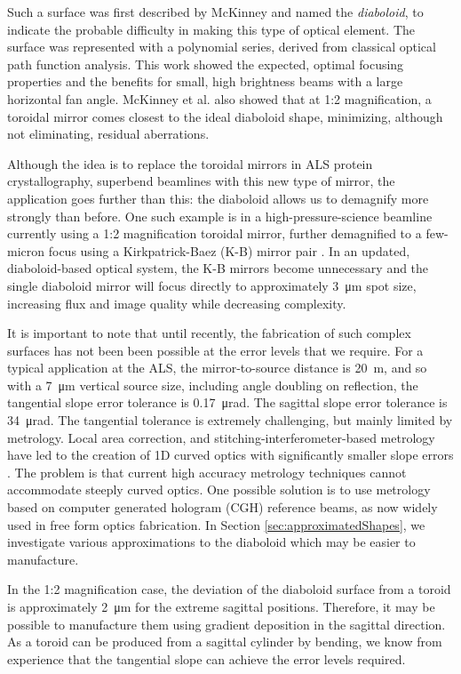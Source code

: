 \documentclass{iucr}       %
\begin{document}
Such a surface was first described by McKinney \cite{McKinneySPIE2009} and named the \emph{diaboloid}, to indicate the probable difficulty in making this type of optical element. The surface was represented with a polynomial series, derived from classical optical path function analysis. This work showed the expected, optimal focusing properties and the benefits for small, high brightness beams with a large horizontal fan angle. McKinney et al. also showed that at 1:2 magnification, a toroidal mirror comes closest to the ideal diaboloid shape, minimizing, although not eliminating, residual aberrations.

Although the idea is to replace the toroidal mirrors in ALS protein crystallography, superbend beamlines with this new type of mirror, the application goes further than this: the diaboloid allows us to demagnify more strongly than before. One such example is in a high-pressure-science beamline currently using a 1:2 magnification toroidal mirror, further demagnified to a few-micron focus using a Kirkpatrick-Baez (K-B) mirror pair \cite{Kirkpatrick1946}. In an updated, diaboloid-based optical system, the K-B mirrors become unnecessary and the single diaboloid mirror will focus directly to approximately \SI{3}{\micro\meter} spot size, increasing flux and image quality while decreasing complexity.

It is important to note that until recently, the fabrication of such complex surfaces has not been been possible at the error levels that we require. For a typical application at the ALS, the mirror-to-source distance is \SI{20}{\meter}, and so with a \SI{7}{\micro\meter} vertical source size, including angle doubling on reflection, the tangential slope error tolerance is \SI{0.17}{\micro\radian}. The sagittal slope error tolerance is \SI{34}{\micro\radian}. The tangential tolerance is extremely challenging, but mainly limited by metrology. Local area correction, and stitching-interferometer-based metrology have led to the creation of 1D curved optics with significantly smaller slope errors \cite{Yamauchi2002}. The problem is that current high accuracy metrology techniques cannot accommodate steeply curved optics. One possible solution is to use metrology based on computer generated hologram (CGH) reference beams, as now widely used in free form optics fabrication. In Section \ref{sec:approximatedShapes}, we investigate various approximations to the diaboloid which may be easier to manufacture.

In the 1:2 magnification case, the deviation of the diaboloid surface from a toroid is approximately \SI{2}{\micro\meter} for the extreme sagittal positions. Therefore, it may be possible to manufacture them using gradient deposition in the sagittal direction. As a toroid can be produced from a sagittal cylinder by bending, we know from experience that the tangential slope can achieve the error levels required.
\end{document}
